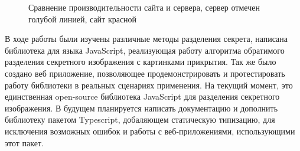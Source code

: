 \documentclass[a4paper,article,14pt]{extarticle}
\begin{document}
\begin{figure}[H]
    \caption{Сравнение производительности сайта и сервера, сервер отмечен голубой линией, сайт красной}
    \label{fig:site-server}
\end{figure}


\newpage
{}
В ходе работы были изучены различные методы разделения секрета, написана библиотека для языка JavaScript, реализующая работу алгоритма 
обратимого разделения секретного изображения с картинками прикрытия. Так же было создано веб приложение, позволяющее продемонстрировать и 
протестировать работу библиотеки в реальных сценариях применения. На текущий момент, это единственная open-source библиотека JavaScript для 
разделения секретного изображения. В будущем планируется написать документацию и дополнить библиотеку пакетом Typescript, 
добаляющем статическую типизацию, для исключения возможных ошибок и работы с веб-приложениями, использующими этот пакет.
\end{document}
